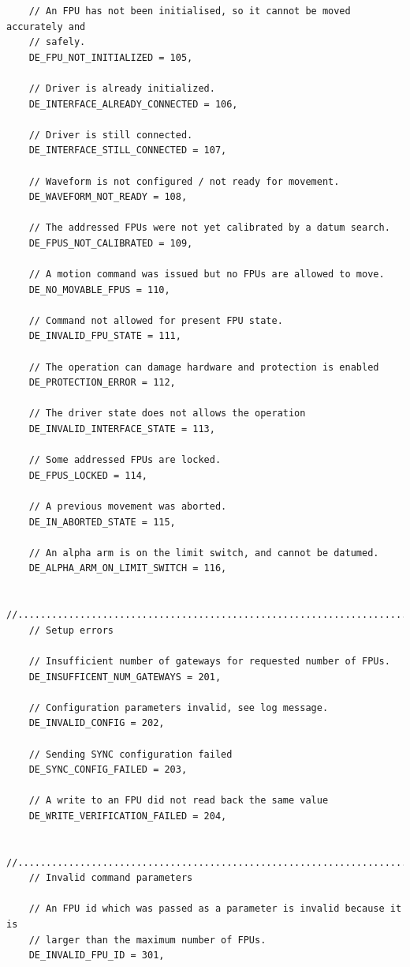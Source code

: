\documentclass[fontsize=12,a4paper]{scrreprt}
\begin{document}
\begin{verbatim}
    // An FPU has not been initialised, so it cannot be moved accurately and
    // safely.
    DE_FPU_NOT_INITIALIZED = 105,

    // Driver is already initialized.
    DE_INTERFACE_ALREADY_CONNECTED = 106,

    // Driver is still connected.
    DE_INTERFACE_STILL_CONNECTED = 107,

    // Waveform is not configured / not ready for movement.
    DE_WAVEFORM_NOT_READY = 108,

    // The addressed FPUs were not yet calibrated by a datum search.
    DE_FPUS_NOT_CALIBRATED = 109,

    // A motion command was issued but no FPUs are allowed to move.
    DE_NO_MOVABLE_FPUS = 110,

    // Command not allowed for present FPU state.
    DE_INVALID_FPU_STATE = 111,

    // The operation can damage hardware and protection is enabled
    DE_PROTECTION_ERROR = 112,

    // The driver state does not allows the operation
    DE_INVALID_INTERFACE_STATE = 113,

    // Some addressed FPUs are locked.
    DE_FPUS_LOCKED = 114,

    // A previous movement was aborted.
    DE_IN_ABORTED_STATE = 115,

    // An alpha arm is on the limit switch, and cannot be datumed.
    DE_ALPHA_ARM_ON_LIMIT_SWITCH = 116,

    //..........................................................................
    // Setup errors

    // Insufficient number of gateways for requested number of FPUs.
    DE_INSUFFICENT_NUM_GATEWAYS = 201,

    // Configuration parameters invalid, see log message.
    DE_INVALID_CONFIG = 202,
    
    // Sending SYNC configuration failed
    DE_SYNC_CONFIG_FAILED = 203,

    // A write to an FPU did not read back the same value
    DE_WRITE_VERIFICATION_FAILED = 204,

    //..........................................................................
    // Invalid command parameters

    // An FPU id which was passed as a parameter is invalid because it is
    // larger than the maximum number of FPUs.
    DE_INVALID_FPU_ID = 301,


\end{verbatim}
\end{document}
